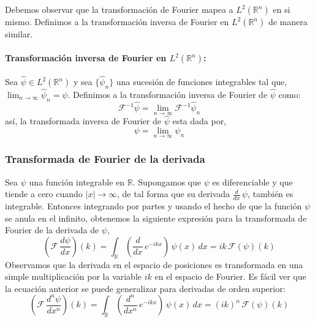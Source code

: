 \documentclass[12pt]{book}
\numberwithin{equation}{chapter}
\def\n{\noindent}
\def\R{\mathbb{R}}
\def\rar{\rightarrow}
\def\F{\mathcal{F}}
\begin{document}
\vspace{5 mm}

\n Debemos observar que la transformaci\'on de Fourier mapea a $L^{2}(\R^{n})$ en si mismo. Definimos a la transformaci\'on inversa de Fourier en $L^{2}(\R^{n})$ de manera similar. 

\paragraph{Transformaci\'on inversa de Fourier en $L^{2}(\R^{n})$:} Sea $\hat{\psi} \in L^{2}(\R^{n}) $ y sea $\{ \hat{\psi}_{n} \}$ una sucesi\'on de funciones integrables tal que, $ \lim_{n \rar \infty} \hat{\psi}_{n} =\hat{\psi} $. Definimos a la transformaci\'on inversa de Fourier de $\hat{\psi}$ como:
\begin{equation}
\F^{-1} \hat{\psi} = \lim_{n \rar \infty} \F^{-1} \hat{\psi}_{n}
\end{equation}
as\'i, la transformada inversa de Fourier de $\hat{\psi}$ esta dada por,
\begin{equation}
\psi = \lim_{n \rar \infty} \psi_{n}
\end{equation}
\rightline{$\dag$}

\subsubsection{Transformada de Fourier de la derivada}
Sea $\psi$ una funci\'on integrable en $\R$. Supongamos que $\psi$ es diferenciable y que tiende a cero cuando $|x| \rar \infty$, de tal forma que su derivada $\frac{d}{d x}\, \psi$, tambi\'en es integrable. Entonces integrando por partes y usando el hecho de que la funci\'on $\psi$ se anula en el infinito, obtenemos la siguiente expresi\'on para la transformada de Fourier de la derivada de $\psi$,
\begin{equation}\label{f-der}
\left(\F \, \frac{d \psi}{d x} \right)(k)= \int_{\R} \left( \frac{d}{dx}\,e^{-ikx} \right)\, \psi(x)\, dx = ik \, \F(\psi)(k) 
\end{equation}
Observamos que la derivada en el espacio de posiciones es transformada en una simple multiplicaci\'on por la variable $ik$ en el espacio de Fourier. Es f\'acil ver que la ecuaci\'on anterior se puede generalizar para derivadas de orden superior:
\begin{equation}\label{f-dern}
\left(\F \, \frac{d^{n} \psi}{d x^{n}} \right)(k)= \int_{\R} \left( \frac{d^{n}}{dx^{n}}\,e^{-ikx} \right)\, \psi(x)\, dx = (ik)^{n} \, \F(\psi)(k) 
\end{equation}
\end{document}
